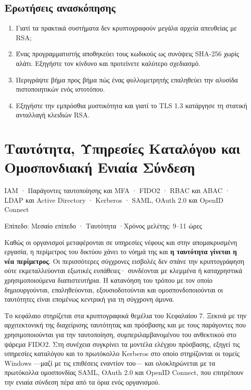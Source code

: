 \documentclass[11pt,openany]{book}
\newcommand{\chaptermeta}[3]{%
  {\sffamily\small\color{accent}#1\par}\vspace{0.3em}
  {\sffamily\footnotesize\color{gray}#2 \quad·\quad #3\par}\vspace{1.2em}}
\begin{document}
\section*{Ερωτήσεις ανασκόπησης}
\begin{enumerate}
  \item Γιατί τα πρακτικά συστήματα δεν κρυπτογραφούν μεγάλα αρχεία απευθείας με RSA;
  \item Ένας προγραμματιστής αποθηκεύει τους κωδικούς ως συνόψεις SHA-256 χωρίς αλάτι. Εξηγήστε τον κίνδυνο και προτείνετε καλύτερο σχεδιασμό.
  \item Περιγράψτε βήμα προς βήμα πώς ένας φυλλομετρητής επαληθεύει την αλυσίδα πιστοποιητικών ενός ιστοτόπου.
  \item Εξηγήστε την εμπρόσθια μυστικότητα και γιατί το TLS 1.3 κατάργησε τη στατική ανταλλαγή κλειδιών RSA.
\end{enumerate}

\chapter{Ταυτότητα, Υπηρεσίες Καταλόγου και Ομοσπονδιακή Ενιαία Σύνδεση}\label{ch:8}
\chaptermeta{IAM · Παράγοντες ταυτοποίησης και MFA · FIDO2 · RBAC και ABAC · LDAP και Active Directory · Kerberos · SAML, OAuth 2.0 και OpenID Connect}{Επίπεδο: Μεσαίο επίπεδο · Ταυτότητα}{Χρόνος μελέτης: 9–11 ώρες}

Καθώς οι οργανισμοί μεταφέρονται σε υπηρεσίες νέφους και στην απομακρυσμένη εργασία, η περίμετρος του δικτύου χάνει το νόημά της και \textbf{η ταυτότητα γίνεται η νέα περίμετρος}. Οι περισσότερες σύγχρονες εισβολές δεν σπάνε την κρυπτογράφηση ούτε εκμεταλλεύονται εξωτικές ευπάθειες· συνδέονται με κλεμμένα ή καταχρηστικά χρησιμοποιούμενα διαπιστευτήρια. Η κατανόηση του τρόπου με τον οποίο δημιουργούνται, επαληθεύονται, εξουσιοδοτούνται και ομοσπονδοποιούνται οι ταυτότητες είναι επομένως κεντρική για τη σύγχρονη άμυνα.

Το κεφάλαιο στηρίζεται στα κρυπτογραφικά θεμέλια του Κεφαλαίου 7. Ξεκινά με την αρχιτεκτονική της διαχείρισης ταυτότητας και πρόσβασης και με τους παράγοντες που χρησιμοποιούνται για την ταυτοποίηση, συμπεριλαμβανομένου του ανθεκτικού στο ψάρεμα FIDO2. Στη συνέχεια συγκρίνει τα μοντέλα ελέγχου πρόσβασης, εξηγεί τις υπηρεσίες καταλόγου και το πρωτόκολλο Kerberos στο οποίο στηρίζονται οι τομείς Windows —μαζί με τις επιθέσεις εναντίον του— και ολοκληρώνεται με τα πρωτόκολλα ομοσπονδίας SAML, OAuth 2.0 και OpenID Connect, που επιτρέπουν την ενιαία σύνδεση πέρα από τα όρια ενός οργανισμού.
\end{document}
